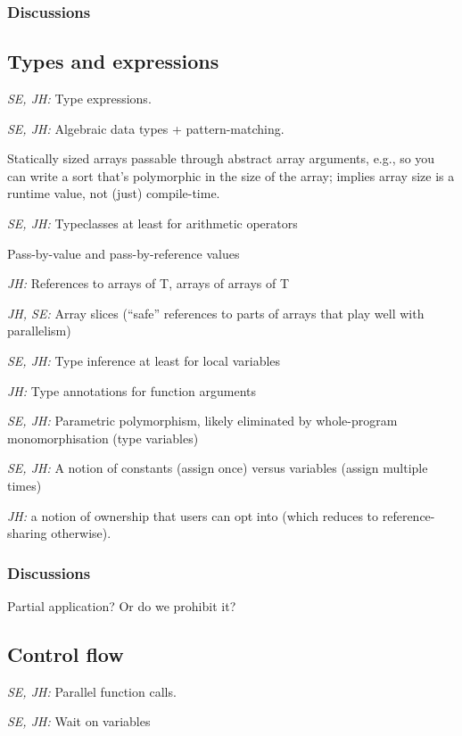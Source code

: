 \documentclass{article}
\begin{document}
\subsubsection{Discussions}

\subsection{Types and expressions}

\textit{SE, JH:} Type expressions.

\textit{SE, JH:} Algebraic data types + pattern-matching.

Statically sized arrays passable through abstract array arguments, e.g., so you
can write a sort that's polymorphic in the size of the array; implies array size
is a runtime value, not (just) compile-time.

\textit{SE, JH:} Typeclasses at least for arithmetic operators

Pass-by-value and pass-by-reference values

\textit{JH:} References to arrays of T, arrays of arrays of T

\textit{JH, SE:} Array slices (``safe'' references to parts of arrays that play
well with parallelism)

\textit{SE, JH:} Type inference at least for local variables

\textit{JH:} Type annotations for function arguments

\textit{SE, JH:} Parametric polymorphism, likely eliminated by whole-program
monomorphisation (type variables)

\textit{SE, JH:} A notion of constants (assign once) versus variables (assign
multiple times)

\textit{JH:} a notion of ownership that users can opt into (which reduces to
reference-sharing otherwise).

\subsubsection{Discussions}

Partial application?  Or do we prohibit it?

\subsection{Control flow}

\textit{SE, JH:} Parallel function calls.

\textit{SE, JH:} Wait on variables
\end{document}
